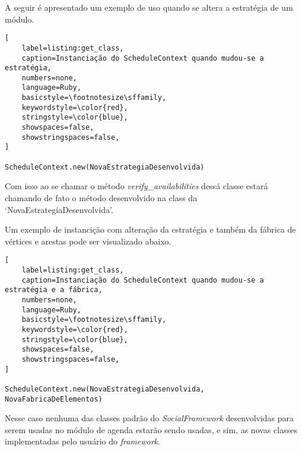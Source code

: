 A seguir é apresentado um exemplo de uso quando se altera a estratégia de um módulo.

\begin{lstlisting}[
    label=listing:get_class,
    caption=Instanciação do ScheduleContext quando mudou-se a estratégia,
    numbers=none,
    language=Ruby,
    basicstyle=\footnotesize\sffamily,
    keywordstyle=\color{red},
    stringstyle=\color{blue},
    showspaces=false,
    showstringspaces=false,
]

ScheduleContext.new(NovaEstrategiaDesenvolvida)
\end{lstlisting}

Com isso ao se chamar o método \textit{verify\_availabilities} dessá classe estará chamando de fato o método desenvolvido na class da `NovaEstrategiaDesenvolvida'.

Um exemplo de instancição com alteração da estratégia e também da fábrica de vértices e arestas pode ser visualizado abaixo.

\begin{lstlisting}[
    label=listing:get_class,
    caption=Instanciação do ScheduleContext quando mudou-se a estratégia e a fábrica,
    numbers=none,
    language=Ruby,
    basicstyle=\footnotesize\sffamily,
    keywordstyle=\color{red},
    stringstyle=\color{blue},
    showspaces=false,
    showstringspaces=false,
]

ScheduleContext.new(NovaEstrategiaDesenvolvida, NovaFabricaDeElementos)
\end{lstlisting}

Nesse caso nenhuma das classes padrão do \textit{SocialFramework} desenvolvidas para serem usadas no módulo de agenda estarão sendo usadas, e sim, as novas classes implementadas pelo usuário do \textit{framework}.
